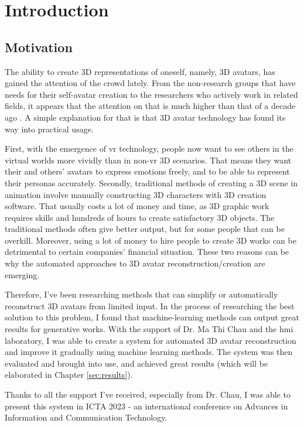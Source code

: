 \section{Introduction}
\label{sec:intro}

\subsection{Motivation}
\label{sec:intro/motivation}
The ability to create 3D representations of oneself, namely, 3D avatars, has gained the attention of the crowd lately. From the non-research groups that have needs for their self-avatar creation to the researchers who actively work in related fields, it appears that the attention on that is much higher than that of a decade ago \citationneeded. A simple explanation for that is that 3D avatar technology has found its way into practical usage.



First, with the emergence of \gls{vr} technology, people now want to see others in the virtual worlds more vividly than in non-\gls{vr} 3D scenarios. That means they want their and others' avatars to express emotions freely, and to be able to represent their personas accurately. Secondly, traditional methods of creating a 3D scene in animation involve manually constructing 3D characters with 3D creation software. That usually costs a lot of money and time, as 3D graphic work requires skills and hundreds of hours to create satisfactory 3D objects. The traditional methods often give better output, but for some people that can be overkill. Moreover, using a lot of money to hire people to create 3D works can be detrimental to certain companies' financial situation. These two reasons can be why the automated approaches to 3D avatar reconstruction/creation are emerging.


Therefore, I've been researching methods that can simplify or automatically reconstruct 3D avatars from limited input. In the process of researching the best solution to this problem, I found that machine-learning methods can output great results for generative works. With the support of Dr. Ma Thi Chau and the \gls{hmi} laboratory, I was able to create a system for automated 3D avatar reconstruction and improve it gradually using machine learning methods. The system was then evaluated and brought into use, and achieved great results (which will be elaborated in Chapter \ref{sec:results}).


Thanks to all the support I've received, especially from Dr. Chau, I was able to present this system in ICTA 2023 - an international conference on Advances in Information and Communication Technology.

